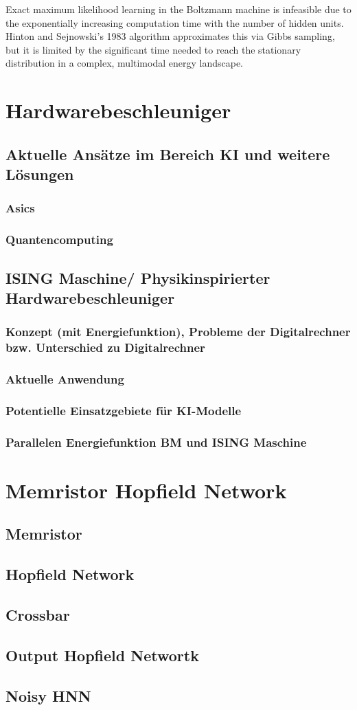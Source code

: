 Exact maximum likelihood learning in the Boltzmann machine is infeasible due to the exponentially increasing computation time with the number of hidden units.
Hinton and Sejnowski's 1983 algorithm approximates this via Gibbs sampling, but it is limited by the significant time needed to reach the stationary distribution in a complex, multimodal energy landscape.

\section{Hardwarebeschleuniger}
\subsection{Aktuelle Ansätze im Bereich KI und weitere Lösungen}
\subsubsection{Asics}
\subsubsection{Quantencomputing}
\subsection{ISING Maschine/ Physikinspirierter Hardwarebeschleuniger}
\subsubsection{Konzept (mit Energiefunktion), Probleme der Digitalrechner bzw. Unterschied zu Digitalrechner}
\subsubsection{Aktuelle Anwendung}
\subsubsection{Potentielle Einsatzgebiete für KI-Modelle}
\subsubsection{Parallelen Energiefunktion BM und ISING Maschine}

\section{Memristor Hopfield Network}
\subsection{Memristor}
\subsection{Hopfield Network}
\subsection{Crossbar}
\subsection{Output Hopfield Networtk}
\subsection{Noisy HNN}
